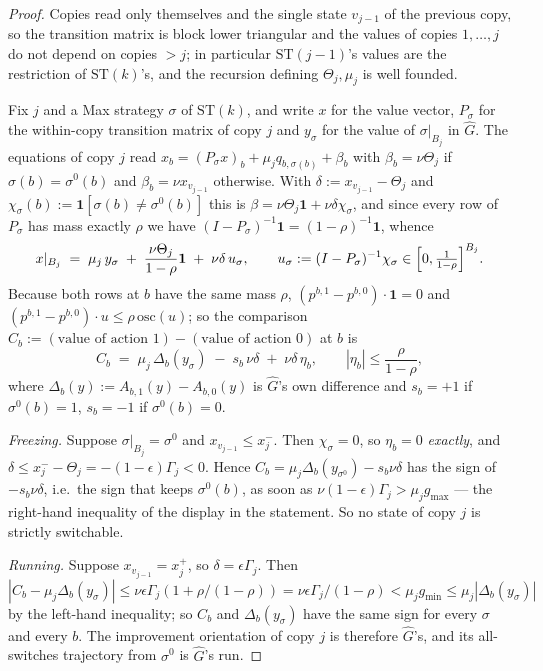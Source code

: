 \documentclass[11pt]{article}
\theoremstyle{plain}
\theoremstyle{definition}
\begin{document}
\begin{proof}
Copies read only themselves and the single state $v_{j-1}$ of the previous copy, so
the transition matrix is block lower triangular and the values of copies
$1,\dots,j$ do not depend on copies $>j$; in particular $\mathrm{ST}(j-1)$'s values are
the restriction of $\mathrm{ST}(k)$'s, and the recursion defining $\Theta_j,\mu_j$ is
well founded.

Fix $j$ and a Max strategy $\sigma$ of $\mathrm{ST}(k)$, and write $x$ for the value
vector, $P_\sigma$ for the within-copy transition matrix of copy $j$ and
$y_\sigma$ for the value of $\sigma|_{B_j}$ in $\widehat G$. The equations of copy $j$
read $x_b=(P_\sigma x)_b+\mu_jq_{b,\sigma(b)}+\beta_b$ with
$\beta_b=\nu\Theta_j$ if $\sigma(b)=\sigma^{0}(b)$ and $\beta_b=\nu x_{v_{j-1}}$
otherwise. With $\delta:=x_{v_{j-1}}-\Theta_j$ and
$\chi_\sigma(b):=\mathbf 1[\sigma(b)\ne\sigma^{0}(b)]$ this is
$\beta=\nu\Theta_j\mathbf 1+\nu\delta\chi_\sigma$, and since every row of $P_\sigma$
has mass exactly $\rho$ we have $(I-P_\sigma)^{-1}\mathbf 1=(1-\rho)^{-1}\mathbf 1$,
whence
\[
  x|_{B_j}\;=\;\mu_j\,y_\sigma\;+\;\frac{\nu\Theta_j}{1-\rho}\mathbf 1
  \;+\;\nu\delta\,u_\sigma,\qquad u_\sigma:=(I-P_\sigma)^{-1}\chi_\sigma\in\Bigl[0,\tfrac1{1-\rho}\Bigr]^{B_j}.
\]
Because both rows at $b$ have the same mass $\rho$, $(p^{b,1}-p^{b,0})\cdot\mathbf 1=0$
and $(p^{b,1}-p^{b,0})\cdot u\le\rho\,\mathrm{osc}(u)$; so the comparison
$C_b:=(\text{value of action }1)-(\text{value of action }0)$ at $b$ is
\[
  C_b\;=\;\mu_j\,\Delta_b(y_\sigma)\;-\;s_b\,\nu\delta\;+\;\nu\delta\,\eta_b,
  \qquad |\eta_b|\le\frac{\rho}{1-\rho},
\]
where $\Delta_b(y):=A_{b,1}(y)-A_{b,0}(y)$ is $\widehat G$'s own difference and
$s_b=+1$ if $\sigma^{0}(b)=1$, $s_b=-1$ if $\sigma^{0}(b)=0$.

\emph{Freezing.} Suppose $\sigma|_{B_j}=\sigma^{0}$ and $x_{v_{j-1}}\le x^{-}_j$. Then
$\chi_\sigma=0$, so $\eta_b=0$ \emph{exactly}, and
$\delta\le x^{-}_j-\Theta_j=-(1-\epsilon)\Gamma_j<0$. Hence
$C_b=\mu_j\Delta_b(y_{\sigma^{0}})-s_b\nu\delta$ has the sign of $-s_b\nu\delta$,
i.e.\ the sign that keeps $\sigma^{0}(b)$, as soon as
$\nu(1-\epsilon)\Gamma_j>\mu_jg_{\max}$ --- the right-hand inequality of the display in
the statement. So no state of copy $j$ is strictly switchable.

\emph{Running.} Suppose $x_{v_{j-1}}=x^{+}_j$, so $\delta=\epsilon\Gamma_j$. Then
$|C_b-\mu_j\Delta_b(y_\sigma)|\le\nu\epsilon\Gamma_j(1+\rho/(1-\rho))
=\nu\epsilon\Gamma_j/(1-\rho)<\mu_jg_{\min}\le\mu_j|\Delta_b(y_\sigma)|$ by the
left-hand inequality; so $C_b$ and $\Delta_b(y_\sigma)$ have the same sign for every
$\sigma$ and every $b$. The improvement orientation of copy $j$ is therefore
$\widehat G$'s, and its all-switches trajectory from $\sigma^{0}$ is $\widehat G$'s run.


\end{proof}
\end{document}
